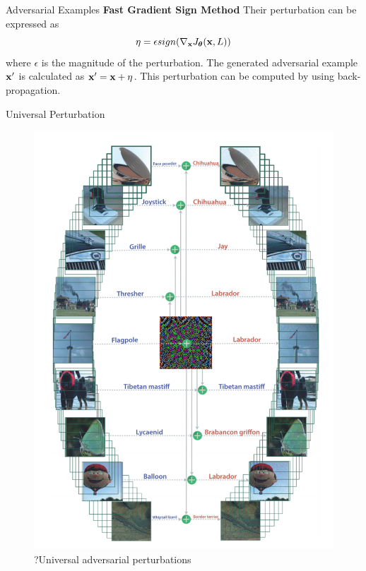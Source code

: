 \documentclass[xcolor=pdftex,dvipsnames,table,mathserif]{beamer}
\begin{document}


\begin{frame}{Adversarial Examples}
\textbf{Fast Gradient Sign Method}
Their perturbation can be expressed as
\begin{equation}
\eta =\epsilon sign(\nabla_{\mathbf{x}} J_{\boldsymbol{\theta}} (\mathbf{x},L))
\end{equation}
where $\epsilon$ is the magnitude of the perturbation.
The generated adversarial example $\mathbf{x}'$ is calculated as $\mathbf{x}'=\mathbf{x}+\eta$.
This perturbation can be computed by using back-propagation.
\end{frame}

\begin{frame}{Universal Perturbation}
\begin{figure}
\includegraphics[width=.55\columnwidth]{../graphics/UniversalPerturbation}
\caption{ ?Universal adversarial perturbations}
\end{figure}
\end{frame}
\end{document}
